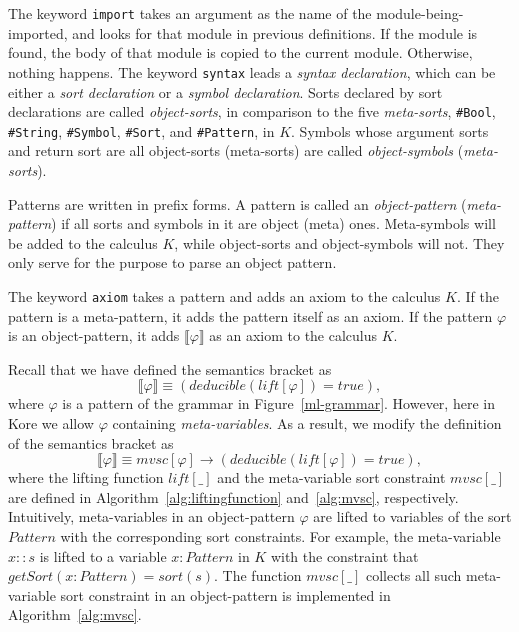 \documentclass[UTF8]{article}
\theoremstyle{plain}
\theoremstyle{definition}
\theoremstyle{remark}
\newcommand{\cln}{{:}}
\newcommand{\Bracket}[1]
    {\llbracket#1\rrbracket}
\begin{document}
The keyword \verb|import| takes an argument as the name of the module-being-imported, and looks for that module in previous definitions. 
If the module is found, the body of that module is copied to the current module.
Otherwise, nothing happens. 
The keyword \verb|syntax| leads a \emph{syntax declaration}, which can be either a \emph{sort declaration} or a \emph{symbol declaration}.
Sorts declared by sort declarations are called \emph{object-sorts}, in comparison to the five \emph{meta-sorts}, \verb|#Bool|, \verb|#String|, \verb|#Symbol|, \verb|#Sort|, and \verb|#Pattern|, in $K$. 
Symbols whose argument sorts and return sort are all object-sorts (meta-sorts) are called \emph{object-symbols} (\emph{meta-sorts}).

Patterns are written in prefix forms. 
A pattern is called an \emph{object-pattern} (\emph{meta-pattern}) if all sorts and symbols in it are object (meta) ones.
Meta-symbols will be added to the calculus $K$, while object-sorts and object-symbols will not.
They only serve for the purpose to parse an object pattern. 

The keyword \verb|axiom| takes a pattern and adds an axiom to the calculus $K$.
If the pattern is a meta-pattern, it adds the pattern itself as an axiom.
If the pattern $\varphi$ is an object-pattern, it adds $\Bracket{\varphi}$ as an axiom to the calculus $K$.

Recall that we have defined the semantics bracket as
\begin{equation*}
\Bracket{\varphi} \equiv 
\left(\textit{deducible}\left(\mathit{lift}[\varphi]\right) = true\right),
\end{equation*}
where $\varphi$ is a pattern of the grammar in Figure~\ref{ml-grammar}.
However, here in Kore we allow $\varphi$ containing \emph{meta-variables}.
As a result, we modify the definition of the semantics bracket as $$\Bracket{\varphi} \equiv \mathit{mvsc}[\varphi] \to (deducible\left(\mathit{lift}[\varphi]\right) = true),$$
where the lifting function $\mathit{lift}[\_]$ and the meta-variable sort constraint $\mathit{mvsc}[\_]$ are defined in Algorithm~\ref{alg:liftingfunction} and~\ref{alg:mvsc}, respectively.
Intuitively, meta-variables in an object-pattern $\varphi$ are lifted to variables of the sort $\mathit{Pattern}$ with the corresponding sort constraints. 
For example, the meta-variable $x \cln\cln s$ is lifted to a variable $x \cln \mathit{Pattern}$ in $K$ with the constraint that $\mathit{getSort}(x \cln \mathit{Pattern}) = sort(s)$. The function $\mathit{mvsc}[\_]$ collects all such meta-variable sort constraint in an object-pattern is implemented in Algorithm~\ref{alg:mvsc}.
\end{document}
